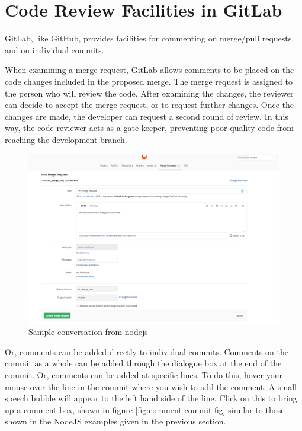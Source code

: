 \documentclass[
]{book}
\begin{document}
\hypertarget{gitlabrev}{%
\section{Code Review Facilities in GitLab}\label{gitlabrev}}

GitLab, like GitHub, provides facilities for commenting on merge/pull requests, and on individual commits.

When examining a merge request, GitLab allows comments to be placed on the code changes included in the proposed merge. The merge request is assigned to the person who will review the code. After examining the changes, the reviewer can decide to accept the merge request, or to request further changes. Once the changes are made, the developer can request a second round of review. In this way, the code reviewer acts as a gate keeper, preventing poor quality code from reaching the development branch.

\begin{figure}

{\centering \includegraphics[width=1\linewidth]{images/merge_request_assignee} 

}

\caption{Sample conversation from nodejs}\label{fig:merge-request-assignee-fig}
\end{figure}

Or, comments can be added directly to individual commits. Comments on the commit as a whole can be added through the dialogue box at the end of the commit. Or, comments can be added at specific lines. To do this, hover your mouse over the line in the commit where you wish to add the comment. A small speech bubble will appear to the left hand side of the line. Click on this to bring up a comment box, shown in figure \ref{fig:comment-commit-fig} similar to those shown in the NodeJS examples given in the previous section.
\end{document}

